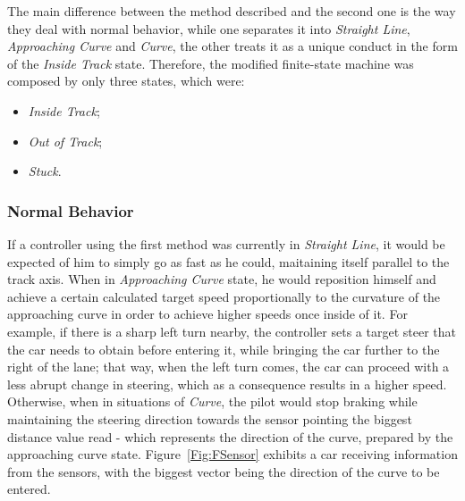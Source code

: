 	The main difference between the method described and the second one is the way they deal with normal behavior, while one separates it into \emph{Straight Line}, \emph{Approaching Curve} and \emph{Curve}, the other treats it as a unique conduct in the form of the \emph{Inside Track} state. Therefore, the modified finite-state machine was composed by only three states, which were:
	
	\begin{itemize}
		
		\item \emph{Inside Track};
		
		\item \emph{Out of Track};
		
		\item \emph{Stuck}.
		
	\end{itemize}
	
\subsubsection{Normal Behavior}
	
	If a controller using the first method was currently in \emph{Straight Line}, it would be expected of him to simply go as fast as he could, maitaining itself parallel to the track axis. When in \emph{Approaching Curve} state, he would reposition himself and achieve a certain calculated target speed proportionally to the curvature of the approaching curve in order to achieve higher speeds once inside of it. For example, if there is a sharp left turn nearby, the controller sets a target steer that the car needs to obtain before entering it, while bringing the car further to the right of the lane; that way, when the left turn comes, the car can proceed with a less abrupt change in steering, which as a consequence results in a higher speed. Otherwise, when in situations of \emph{Curve}, the pilot would stop braking while maintaining the steering direction towards the sensor pointing the biggest distance value read - which represents the direction of the curve, prepared by the approaching curve state. Figure~\ref{Fig:FSensor} exhibits a car receiving information from the sensors, with the biggest vector being the direction of the curve to be entered.
	
